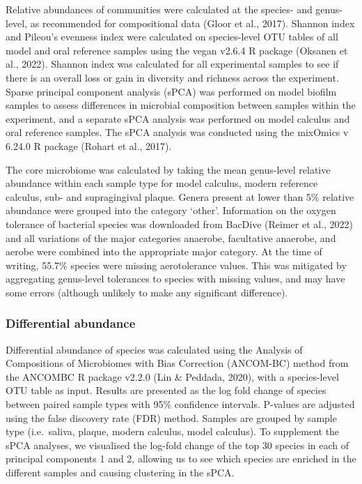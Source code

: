 \documentclass[
]{article}
\begin{document}
Relative abundances of communities were calculated at the species- and
genus-level, as recommended for compositional data (Gloor et al., 2017).
Shannon index and Pileou's evenness index were calculated on
species-level OTU tables of all model and oral reference samples using
the vegan v2.6.4 R package (Oksanen et al., 2022). Shannon index was
calculated for all experimental samples to see if there is an overall
loss or gain in diversity and richness across the experiment. Sparse
principal component analysis (sPCA) was performed on model biofilm
samples to assess differences in microbial composition between samples
within the experiment, and a separate sPCA analysis was performed on
model calculus and oral reference samples. The sPCA analysis was
conducted using the mixOmics v 6.24.0 R package (Rohart et al., 2017).

The core microbiome was calculated by taking the mean genus-level
relative abundance within each sample type for model calculus, modern
reference calculus, sub- and supragingival plaque. Genera present at
lower than 5\% relative abundance were grouped into the category
`other'. Information on the oxygen tolerance of bacterial species was
downloaded from BacDive (Reimer et al., 2022) and all variations of the
major categories anaerobe, facultative anaerobe, and aerobe were
combined into the appropriate major category. At the time of writing,
55.7\% species were missing aerotolerance values. This was mitigated by
aggregating genus-level tolerances to species with missing values, and
may have some errors (although unlikely to make any significant
difference).

\hypertarget{differential-abundance}{%
\subsubsection{Differential abundance}\label{differential-abundance}}

Differential abundance of species was calculated using the Analysis of
Compositions of Microbiomes with Bias Correction (ANCOM-BC) method from
the ANCOMBC R package v2.2.0 (Lin \& Peddada, 2020), with a
species-level OTU table as input. Results are presented as the log fold
change of species between paired sample types with 95\% confidence
intervals. P-values are adjusted using the false discovery rate (FDR)
method. Samples are grouped by sample type (i.e.~saliva, plaque, modern
calculus, model calculus). To supplement the sPCA analyses, we
visualised the log-fold change of the top 30 species in each of
principal components 1 and 2, allowing us to see which species are
enriched in the different samples and causing clustering in the sPCA.
\end{document}
